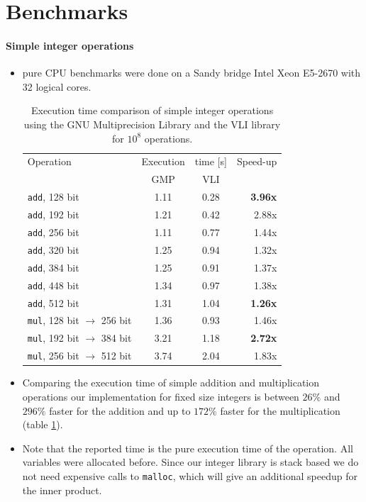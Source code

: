 \documentclass[oribibl,a4paper]{llncs2e/llncs}
\begin{document}
\section{Benchmarks}
\paragraph{Simple integer operations}
\begin{itemize}
\item pure CPU benchmarks were done on a Sandy bridge Intel Xeon E5-2670 with 32 logical cores.
\begin{table}
   \centering
   \begin{tabular}{l|cc|r}
    Operation & Execution & time [s] & Speed-up\\
      & GMP & VLI & \\
    \hline
   \verb|add|, 128 bit & 1.11 & 0.28 & {\bf 3.96x} \\
   \verb|add|, 192 bit & 1.21 & 0.42 & 2.88x \\
   \verb|add|, 256 bit & 1.11 & 0.77 & 1.44x \\
   \verb|add|, 320 bit & 1.25 & 0.94 & 1.32x \\
   \verb|add|, 384 bit & 1.25 & 0.91 & 1.37x \\
   \verb|add|, 448 bit & 1.34 & 0.97 & 1.38x \\
   \verb|add|, 512 bit & 1.31 & 1.04 & {\bf 1.26x} \\
   \hline
   \verb|mul|, 128 bit $\rightarrow$ 256 bit & 1.36 & 0.93 & 1.46x \\
   \verb|mul|, 192 bit $\rightarrow$ 384 bit & 3.21 & 1.18 & {\bf 2.72x} \\
   \verb|mul|, 256 bit $\rightarrow$ 512 bit & 3.74 & 2.04 & 1.83x \\ 
   \end{tabular}
   \caption{Execution time comparison of simple integer operations using the GNU Multiprecision Library and the VLI library for $10^8$ operations.}
   \label{tab:vli_vs_gmp}
\end{table}


\item Comparing the execution time of simple addition and multiplication operations our implementation for fixed size integers is between $26\%$ and $296\%$ faster for the addition and up to $172\%$ faster for the multiplication (table \ref{tab:vli_vs_gmp}).
\item Note that the reported time is the pure execution time of the operation. All variables were allocated before.
Since our integer library is stack based we do not need expensive calls to \verb|malloc|, which will give an additional speedup for the inner product.
\end{itemize}
\end{document}
